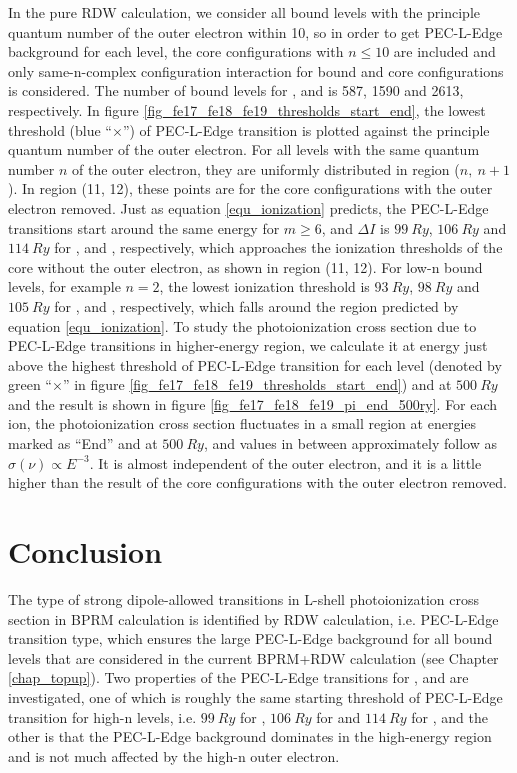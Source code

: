 In the pure RDW calculation, we consider all bound levels with the principle quantum number of the outer electron within 10, so in order to get PEC-L-Edge background for each level, the core configurations with $n\leq10$ are included and only same-n-complex configuration interaction for bound and core configurations is considered. The number of bound levels for  ,  and  is 587, 1590 and 2613, respectively. In figure \ref{fig_fe17_fe18_fe19_thresholds_start_end}, the lowest threshold (blue ``$\times$'') of PEC-L-Edge transition is plotted against the principle quantum number of the outer electron. For all levels with the same quantum number $n$ of the outer electron, they are uniformly distributed in region ($n,~n+1$). In region (11, 12), these points are for the core configurations with the outer electron removed. Just as equation \ref{equ_ionization} predicts, the PEC-L-Edge transitions start around the same energy for $m\geq6$, and $\Delta I$ is $99~Ry$, $106~Ry$ and $114~Ry$ for ,  and , respectively, which approaches the ionization thresholds of the core without the outer electron, as shown in region (11, 12). For low-n bound levels, for example $n=2$, the lowest ionization threshold is $93~Ry$, $98~Ry$ and $105~Ry$ for ,  and , respectively, which falls around the region predicted by equation \ref{equ_ionization}. To study the photoionization cross section due to PEC-L-Edge transitions in higher-energy region, we calculate it at energy just above the highest threshold of PEC-L-Edge transition for each level (denoted by green ``$\times$'' in figure \ref{fig_fe17_fe18_fe19_thresholds_start_end}) and at $500~Ry$ and the result is shown in figure \ref{fig_fe17_fe18_fe19_pi_end_500ry}. For each ion, the photoionization cross section fluctuates in a small region at energies marked as ``End'' and at $500~Ry$, and values in between approximately follow  as \(\sigma(\nu) \propto E^{-3}\). It is almost independent of the outer electron, and it is a little higher than the result of the core configurations with the outer electron removed.




\section{Conclusion}
The type of strong dipole-allowed transitions in L-shell photoionization cross section in BPRM calculation is identified by RDW calculation, i.e. PEC-L-Edge transition type, which ensures the large PEC-L-Edge background for all bound levels that are considered in the current BPRM+RDW calculation (see Chapter \ref{chap_topup}). Two properties of the PEC-L-Edge transitions for ,  and  are investigated, one of which is roughly the same starting threshold of PEC-L-Edge transition for high-n levels, i.e. $99~Ry$ for , $106~Ry$ for  and $114~Ry$ for , and the other is that the PEC-L-Edge background dominates in the high-energy region and is not much affected by the high-n outer electron.


